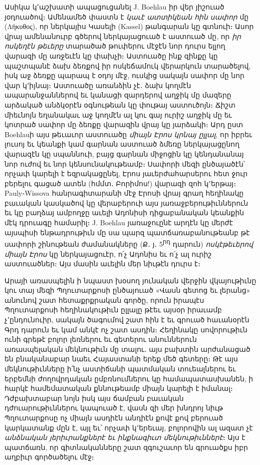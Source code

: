\documentclass{article}
\begin{document}
{Ասիկա կ՚աշխատի ապացուցանել J. Boehlau իր վեր յիշուած յօդուածով։ Ամենամեծ փաստն է \emph{կաւէ ատտիկեան հին սափոր} մը (Λήκυθος), որ ներկայիս Կասելի (Kassel) թանգարան կը գտնուի։ Ասոր վրայ ամենանուրբ գծերով ներկայացուած է աստուած մը, որ \emph{իր ոսկեղէն թեւերը} տարածած թուփերու մէջէն նոր դուրս ելլող վարազի մը առջեւէն կը փախչի։ Աստուածը ինք զինքը կը պաշտպանէ ձախ ձեռքով իր ոսկեճամուկ վերարկուն տարածելով, իսկ աջ ձեռքը պարապ է օդոյ մէջ, ուսկից սակայն սափոր մը նոր վար կ՚իյնայ։ Աստուածը առանձին չէ․ ձախ կողմէն ապարանջաններով եւ կանացի զարդերով աղջիկ մը մազերը արձակած անձկօրէն օգնութեան կը փութայ աստուծոյն։ Ճիշտ միեւնոյն եղանակաւ աջ կողմէն ալ կու գայ ուրիշ աղջիկ մը եւ կոտրած սափոր մը ձեռքը վարազին վրայ կը յարձակի։ Արդ ըստ Boehlauի այս թեւաւոր աստուածը \emph{միայն Էրոս կրնայ ըլլալ}, որ իբրեւ լուսոյ եւ կեանքի կամ գարնան աստուած ձմեռը ներկայացընող վարազէն կը սպաննուի, բայց գարնան միջոցին կը կենդանանայ նոր ուժով եւ նոր կենսունակութեամբ։ Սափորի մեզի ընծայածէն՝ որչափ կարելի է եզրակացընել, Էրոս յաւերժահարսերու հետ ջուր բերելու գացած ատեն (հմմտ․ Բորիմոս!) վարազի զոհ կ՚երթայ։ Pauly֊Wissova հանրագիտարանի մէջ Էրոսի վրայ գրաղ հեղինակը բաւական կասկածով կը վերաբերուի այս յառաջբերութիւններուն եւ կը բաղձայ ամբողջը աւելի Ադոնիսի դիցաբանական կեանքին մէկ դրուագը համարիլ։ J. Boehlau յառաջուընէ արդէն կը մերժէ այսպիսի ենթադրութիւն մը սա պարզ պատճառաբանութեանբ թէ սափորի շինութեան ժամանակները (Ք․ յ․ 5\textsuperscript{րդ} դարուն) \emph{ոսկէթեւերով միայն Էրոս} կը ներկայացուէր, ո՛չ Ադոնիս եւ ո՛չ ալ ուրիշ աստուածներ։ Այս մասին աւելին մեր նիւթէն դուրս է։

Արայի առասպելին ի նպաստ խօսող յունական վերջին վկայութիւնը կու տայ մեզի Պղուտարքոսի ընծայուած «Վասն գետոց եւ լերանց» անունով շատ հետաքրքրական գործը, որուն իրապէս Պղուտարքոսի հեղինակութիւն ըլլալը թէեւ այսօր իրաւամբ չ՚ընդունուիր, սակայն ծագումով շատ հին է եւ գրուած հաւանօրէն Գրդ դարուն եւ կամ անկէ ոչ շատ ասդին։ Հեղինակը սովորութիւն ունի գրեթէ բոլոր լեռներու եւ գետերու անուններուն առասպելական մեկնութիւն մը տալու․ այս բախտին արժանացած են բնականաբար նաեւ Հայաստանի երեք մեծ գետերը։ Թէ այս մեկնութիւնները ի՛նչ աստիճանի պատմական տուեալներու եւ երբեմնի ժողովրդական ըմբռնումներու կը համապատասխանեն, ի հարկէ համեմատական քննութեամբ միայն կարելի է իմանալ։ Դժբախտաբար նոյն իսկ այս ճամբան բաւական դժուարութիւններու կապուած է, վասն զի մեր խնդրոյ նիւթ Պղուտարքոսը ոչ միայն ասդիէն անդիէն քովէ քով բերուած կարկատանք մըն է, այլ եւ՝ որչափ կ՚երեւայ, բոլորովին ալ ազատ չէ \emph{անձնական յերիւրանքներէ եւ ինքնագիւտ մեկնութիւններէ}։ Այս է պատճառն, որ գիտնականները շատ զգուշաւոր են գրուածքս իբր աղբիւր գործածելու մէջ։

}
\end{document}
